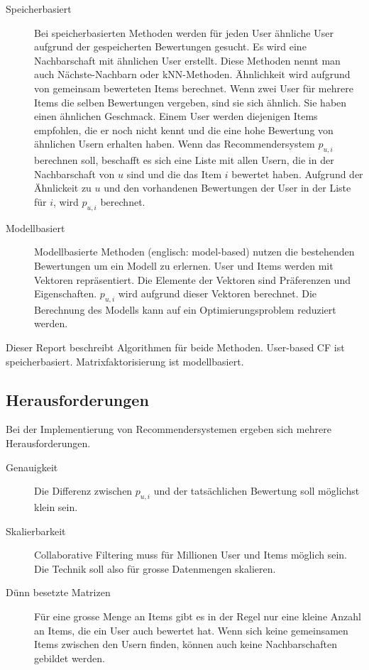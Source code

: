 \documentclass[a4paper, 12pt]{article}
\begin{document}
\begin{description}
\item[Speicherbasiert] Bei speicherbasierten Methoden werden für jeden User ähnliche User aufgrund der gespeicherten Bewertungen gesucht. Es wird eine Nachbarschaft mit ähnlichen User erstellt. Diese Methoden nennt man auch Nächste-Nachbarn oder kNN-Methoden.
Ähnlichkeit wird aufgrund von gemeinsam bewerteten Items berechnet. Wenn zwei User für mehrere Items die selben Bewertungen vergeben, sind sie sich ähnlich. Sie haben einen ähnlichen Geschmack. Einem User werden diejenigen Items empfohlen, die er noch nicht kennt und die eine hohe Bewertung von ähnlichen Usern erhalten haben.
Wenn das Recommendersystem $p_{u,i}$ berechnen soll, beschafft es sich eine Liste mit allen Usern, die in der Nachbarschaft von $u$ sind und die das Item $i$ bewertet haben. Aufgrund der Ähnlickeit zu $u$ und den vorhandenen Bewertungen der User in der Liste für $i$, wird $p_{u,i}$ berechnet.
\item[Modellbasiert] Modellbasierte Methoden (englisch: model-based) nutzen die bestehenden Bewertungen um ein Modell zu erlernen. User und Items werden mit Vektoren repräsentiert. Die Elemente der Vektoren sind Präferenzen und Eigenschaften.  $p_{u,i}$ wird aufgrund dieser Vektoren berechnet. Die Berechnung des Modells kann auf ein Optimierungsproblem reduziert werden.
\end{description}

Dieser Report beschreibt Algorithmen für beide Methoden. User-based CF ist speicherbasiert. Matrixfaktorisierung ist modellbasiert.

\subsection{Herausforderungen}
\label{sec:challenges}

Bei der Implementierung von Recommendersystemen ergeben sich mehrere Herausforderungen.

\begin{description}
\item[Genauigkeit]  Die Differenz zwischen $p_{u,i}$ und der tatsächlichen Bewertung soll möglichst klein sein.
\item[Skalierbarkeit] 
Collaborative Filtering muss für Millionen User und Items möglich sein. Die Technik soll also für grosse Datenmengen skalieren.
\item[Dünn besetzte Matrizen] Für eine grosse Menge an Items gibt es in der Regel nur eine kleine Anzahl an Items, die ein User auch bewertet hat. Wenn sich keine gemeinsamen Items zwischen den Usern finden, können auch keine Nachbarschaften gebildet werden.
\end{description}
\end{document}
